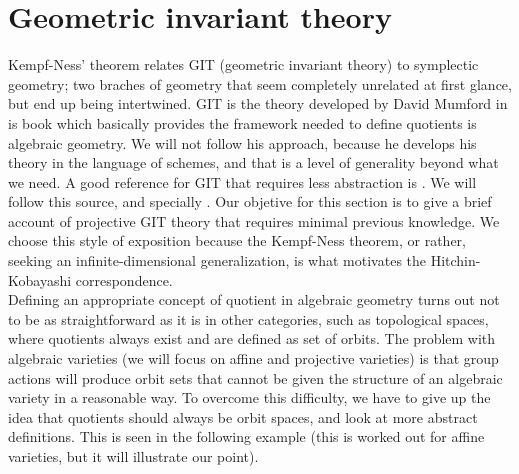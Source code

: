 \section{Geometric invariant theory}
{\color{violet}
Kempf-Ness' theorem relates GIT (geometric invariant theory) to symplectic geometry; two braches of geometry that seem completely unrelated at first glance, but end up being intertwined. GIT is the theory developed by David Mumford in is book \parencite{mumford1994geometric} which basically provides the framework needed to define quotients is algebraic geometry. We will not follow his approach, because he develops his theory in the language of schemes, and that is a level of generality beyond what we need. A good reference for GIT that requires less abstraction is \parencite{hoskins}. We will follow this source, and specially \parencite{szekelyhidi2014introduction}. Our objetive for this section is to give a brief account of projective GIT theory that requires minimal previous knowledge. We choose this style of exposition because the Kempf-Ness theorem, or rather, seeking an infinite-dimensional generalization, is what motivates the Hitchin-Kobayashi correspondence.\\

Defining an appropriate concept of quotient in algebraic geometry turns out not to be as straightforward as it is in other categories, such as topological spaces, where quotients always exist and are defined as set of orbits. The problem with algebraic varieties (we will focus on affine and projective varieties) is that group actions will produce orbit sets that cannot be given the structure of an algebraic variety in a reasonable way. To overcome this difficulty, we have to give up the idea that quotients should always be orbit spaces, and look at more abstract definitions. This is seen in the following example (this is worked out for affine varieties, but it will illustrate our point).

}
